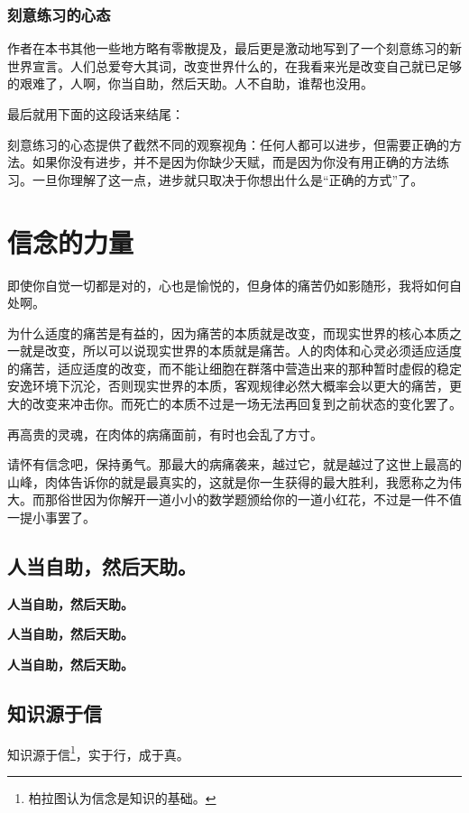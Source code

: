 \documentclass[12pt,oneside]{book}
\begin{document}
\subsection{刻意练习的心态}
作者在本书其他一些地方略有零散提及，最后更是激动地写到了一个刻意练习的新世界宣言。人们总爱夸大其词，改变世界什么的，在我看来光是改变自己就已足够的艰难了，人啊，你当自助，然后天助。人不自助，谁帮也没用。

最后就用下面的这段话来结尾：

\begin{bookref}[frametitle={\cite{刻意练习}}]
刻意练习的心态提供了截然不同的观察视角：任何人都可以进步，但需要正确的方法。如果你没有进步，并不是因为你缺少天赋，而是因为你没有用正确的方法练习。一旦你理解了这一点，进步就只取决于你想出什么是“正确的方式”了。
\end{bookref}


\chapter{信念的力量}
即使你自觉一切都是对的，心也是愉悦的，但身体的痛苦仍如影随形，我将如何自处啊。

为什么适度的痛苦是有益的，因为痛苦的本质就是改变，而现实世界的核心本质之一就是改变，所以可以说现实世界的本质就是痛苦。人的肉体和心灵必须适应适度的痛苦，适应适度的改变，而不能让细胞在群落中营造出来的那种暂时虚假的稳定安逸环境下沉沦，否则现实世界的本质，客观规律必然大概率会以更大的痛苦，更大的改变来冲击你。而死亡的本质不过是一场无法再回复到之前状态的变化罢了。

再高贵的灵魂，在肉体的病痛面前，有时也会乱了方寸。

请怀有信念吧，保持勇气。那最大的病痛袭来，越过它，就是越过了这世上最高的山峰，肉体告诉你的就是最真实的，这就是你一生获得的最大胜利，我愿称之为伟大。而那俗世因为你解开一道小小的数学题颁给你的一道小红花，不过是一件不值一提小事罢了。


\section{人当自助，然后天助。}
\textbf{人当自助，然后天助。}

\textbf{人当自助，然后天助。}

\textbf{人当自助，然后天助。}

\section{知识源于信}
知识源于信\footnote{柏拉图认为信念是知识的基础。}，实于行，成于真。
\end{document}
